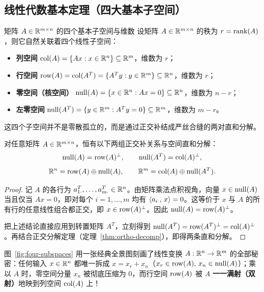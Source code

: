 \subsection{线性代数基本定理（四大基本子空间）}

\begin{recallBox}{矩阵 $A \in \mathbb{R}^{m \times n}$ 的四个基本子空间与维数}
设矩阵 $A \in \mathbb{R}^{m \times n}$ 的秩为 $r = \operatorname{rank}(A)$，则它自然关联着四个线性子空间：
\begin{itemize}
  \item \textbf{列空间} $\operatorname{col}(A) = \{Ax : x \in \mathbb{R}^n\} \subseteq \mathbb{R}^m$，维数为 $r$；
  \item \textbf{行空间} $\operatorname{row}(A) = \operatorname{col}(A^T) = \{A^T y : y \in \mathbb{R}^m\} \subseteq \mathbb{R}^n$，维数为 $r$；
  \item \textbf{零空间（核空间）} $\operatorname{null}(A) = \{x \in \mathbb{R}^n : Ax = 0\} \subseteq \mathbb{R}^n$，维数为 $n - r$；
  \item \textbf{左零空间} $\operatorname{null}(A^T) = \{y \in \mathbb{R}^m : A^T y = 0\} \subseteq \mathbb{R}^m$，维数为 $m - r$。
\end{itemize}
\end{recallBox}

这四个子空间并不是零散孤立的，而是通过正交补结成严丝合缝的两对直和分解。

\begin{thmBox}
\begin{theorem}\label{thm:four-subspaces}
对任意矩阵 $A \in \mathbb{R}^{m \times n}$，恒有以下两组正交补关系与空间直和分解：
\[
\operatorname{null}(A) = \operatorname{row}(A)^\perp, \qquad \operatorname{null}(A^T) = \operatorname{col}(A)^\perp,
\]
\[
\mathbb{R}^n = \operatorname{row}(A) \oplus \operatorname{null}(A), \qquad \mathbb{R}^m = \operatorname{col}(A) \oplus \operatorname{null}(A^T).
\]
\end{theorem}
\end{thmBox}

\begin{proof}
记 $A$ 的各行为 $a_{1\cdot}^T, \dots, a_{m\cdot}^T \in \mathbb{R}^n$。由矩阵乘法点积视角，向量 $x \in \operatorname{null}(A)$ 当且仅当 $Ax = 0$，即对每个 $i = 1, \dots, m$ 均有 $\left\langle a_{i\cdot},\, x \right\rangle = 0$。这等价于 $x$ 与 $A$ 的所有行的任意线性组合都正交，即 $x \in \operatorname{row}(A)^\perp$。因此 $\operatorname{null}(A) = \operatorname{row}(A)^\perp$。

把上述结论直接应用到转置矩阵 $A^T$，立刻得到 $\operatorname{null}(A^T) = \operatorname{row}(A^T)^\perp = \operatorname{col}(A)^\perp$。再结合正交分解定理（定理~\ref{thm:ortho-decomp}），即得两条直和分解。
\end{proof}

图~\ref{fig:four-subspaces} 用一张经典全景图刻画了线性变换 $A: \mathbb{R}^n \to \mathbb{R}^m$ 的全部秘密：任何输入 $x \in \mathbb{R}^n$ 都唯一拆成 $x = x_r + x_n$（$x_r \in \operatorname{row}(A),\, x_n \in \operatorname{null}(A)$）；乘以 $A$ 时，零空间分量 $x_n$ 被彻底压缩为 $0$，而行空间 $\operatorname{row}(A)$ 被 $A$ \textbf{一一满射（双射）}地映到列空间 $\operatorname{col}(A)$ 上！

